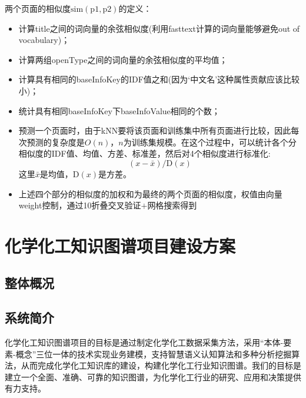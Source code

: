两个页面的相似度$\mathrm{sim(p1,p2)}$的定义：
\begin{itemize}
	\item 计算\textrm{title}之间的词向量的余弦相似度(利用\textrm{fasttext}计算的词向量能够避免out of vocabulary)；
	\item 计算两组\textrm{openType}之间的词向量的余弦相似度的平均值；
	\item 计算具有相同的\textrm{baseInfoKey}的\textrm{IDF}值之和(因为‘中文名’这种属性贡献应该比较小)；
	\item 统计具有相同\textrm{baseInfoKey}下\textrm{baseInfoValue}相同的个数；
	\item 预测一个页面时，由于\textrm{kNN}要将该页面和训练集中所有页面进行比较，因此每次预测的复杂度是$O(n)$，$n$为训练集规模。在这个过程中，可以统计各个分相似度的\textrm{IDF}值、均值、方差、标准差，然后对4个相似度进行标准化:
		\begin{displaymath}
			(x-\bar{x})/\mathrm{D}(x)
		\end{displaymath}
		这里$\bar{x}$是均值，$\mathrm{D}(x)$是方差。
	\item 上述四个部分的相似度的加权和为最终的两个页面的相似度，权值由向量\textrm{weight}控制，通过10折叠交叉验证$+$网格搜索得到
\end{itemize}

\section{化学化工知识图谱项目建设方案}
\subsection{整体概况}
\subsection{系统简介} 
化学化工知识图谱项目的目标是通过制定化学化工数据采集方法，采用``本体-要素-概念''三位一体的技术实现业务建模，支持智慧语义认知算法和多种分析挖掘算法，从而完成化学化工知识库的建设，构建化学化工行业知识图谱。我们的目标是建立一个全面、准确、可靠的知识图谱，为化学化工行业的研究、应用和决策提供有力支持。
